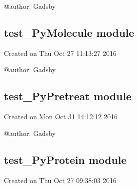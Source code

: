 \documentclass[letterpaper,10pt,english]{sphinxmanual}
\begin{document}
@author: Gadsby

\begin{fulllineitems}
\label{reference/test_PyInteration:test_PyInteration.test_pyinteration}
\end{fulllineitems}



\subsection{test\_PyMolecule module}
\label{reference/test_PyMolecule:test-pymolecule-module}\label{reference/test_PyMolecule::doc}\label{reference/test_PyMolecule:module-test_PyMolecule}
Created on Thu Oct 27 11:13:27 2016

@author: Gadsby

\begin{fulllineitems}
\label{reference/test_PyMolecule:test_PyMolecule.test_pymolecule}
\end{fulllineitems}



\subsection{test\_PyPretreat module}
\label{reference/test_PyPretreat:test-pypretreat-module}\label{reference/test_PyPretreat::doc}\label{reference/test_PyPretreat:module-test_PyPretreat}
Created on Mon Oct 31 14:12:12 2016

@author: Gadsby

\begin{fulllineitems}
\label{reference/test_PyPretreat:test_PyPretreat.test_pypretreat}
\end{fulllineitems}



\subsection{test\_PyProtein module}
\label{reference/test_PyProtein:test-pyprotein-module}\label{reference/test_PyProtein::doc}\label{reference/test_PyProtein:module-test_PyProtein}
Created on Thu Oct 27 09:38:03 2016
\end{document}

